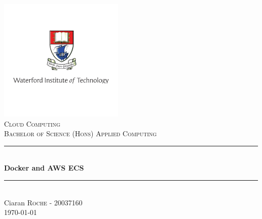 \begin{titlepage}

\newcommand{\HRule}{\rule{\linewidth}{0.5mm}}

\center

\includegraphics{images/logo.png}\\
\textsc{\Large Cloud Computing}\\[0.5cm]
\textsc{\large Bachelor of Science (Hons) Applied Computing }\\[0.5cm] 


\HRule \\[0.4cm]
{ \huge \bfseries Docker and AWS ECS}\\[0.4cm] 
\HRule \\[1.5cm]

\Large Ciaran \textsc{Roche} - 20037160\\[3cm]


{\large \today}\\[1cm]

\vfill 

\end{titlepage}
